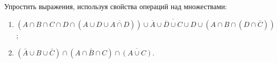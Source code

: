 \question
Упростить выражения, используя свойства операций над множествами:

\begin{enumerate}
	\renewcommand{\labelenumi}{\alph{enumi})}
	\item $(A\cap B \cap C \cap D \cap (A\cup D \cup \overline{A\cap D}))\cup \overline{\overline{A}\cup \overline{D}\cup C\cup D}\cup (A\cap B \cap (D\cap\overline{C}))$;
	\item $(\bar{A} \cup B \cup \bar{C}) \cap(A \cap \bar{B} \cap C) \cap \overline{(A \cup C)}$.
\end{enumerate}
